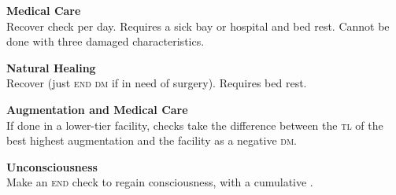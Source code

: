 \documentclass{cheatsheet}
\begin{document}
\begin{multicols}{2}
\textbf{Medical Care}\\
Recover  check per day.  Requires a
sick bay or hospital and bed rest.  Cannot be done with three damaged
characteristics.

\textbf{Natural Healing}\\
Recover  (just \textsc{end dm} if in need of
surgery).  Requires bed rest.

\textbf{Augmentation and Medical Care}\\
If done in a lower-tier facility, checks take the difference between
the \textsc{tl} of the best highest augmentation and the facility as a
negative \textsc{dm}.

\textbf{Unconsciousness}\\
Make an \textsc{end} check to regain consciousness, with a cumulative
.
\end{multicols}
\end{document}
